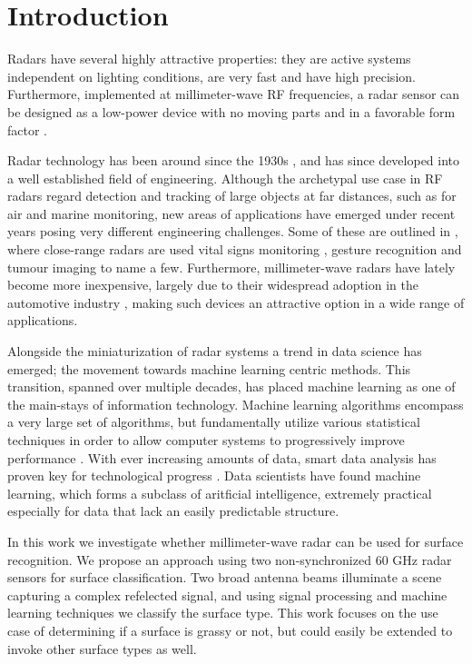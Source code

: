 \chapter{Introduction}


Radars have several highly attractive properties: they are active systems independent on lighting conditions, are very fast and have high precision. Furthermore, implemented at millimeter-wave RF frequencies, a radar sensor can be designed as a low-power device with no moving parts and in a favorable form factor \citep{lien_gillian_karagozler_amihood_schwesig_olson_raja_poupyrev_2016}.

Radar technology has been around since the 1930s \citep{watson-watt_1945}, and has since developed into a well established field of engineering. Although the archetypal use case in RF radars regard detection and tracking of large objects at far distances, such as for air and marine monitoring, new areas of applications have emerged under recent years posing very different engineering challenges. Some of these are outlined in \citep{amin_2017}, where close-range radars are used vital signs monitoring \citep{kuo_lin_yu_lo_lyu_chou_chuang_2016}, gesture recognition \citep{lien_gillian_karagozler_amihood_schwesig_olson_raja_poupyrev_2016} and tumour imaging \citep{klemm_gibbins_leendertz_horseman_preece_benjamin_craddock_2011} to name a few. Furthermore, millimeter-wave radars have lately become more inexpensive, largely due to their widespread adoption in the automotive industry \citep{frenzel_2018}, making such devices an attractive option in a wide range of applications.

Alongside the miniaturization of radar systems a trend in data science has emerged; the movement towards machine learning centric methods. This transition, spanned over multiple decades, has placed machine learning as one of the main-stays of information technology. Machine learning algorithms encompass a very large set of algorithms, but fundamentally utilize various statistical techniques in order to allow computer systems to progressively improve performance \citep{a_smola_svn_vishwanathan_2010}. With ever increasing amounts of data, smart data analysis has proven key for technological progress . Data scientists have found machine learning, which forms a subclass of aritficial intelligence, extremely practical especially for data that lack an easily predictable structure.

In this work we investigate whether millimeter-wave radar can be used for surface recognition. We propose an approach using two non-synchronized 60 GHz radar sensors for surface classification. Two broad antenna beams illuminate a scene capturing a complex refelected signal, and using signal processing and machine learning techniques we classify the surface type. This work focuses on the use case of determining if a surface is grassy or not, but could easily be extended to invoke other surface types as well.  

